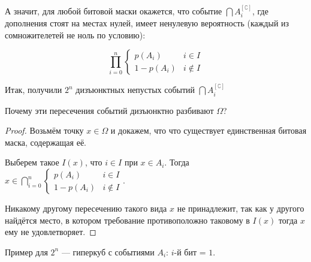 \documentclass[12pt, a4paper]{article}
\begin{document}
А значит, для любой битовой маски окажется, что событие $\bigcap A_i^{[\complement]}$, где дополнения стоят на местах нулей,
имеет ненулевую вероятность (каждый из сомножителетей не ноль по условию):

\begin{equation}
    \prod^n_{i = 0} \begin{cases}
        p(A_i) & i \in I \\
        1 - p(A_i) & i \notin I
    \end{cases}
\end{equation}

Итак, получили $2^n$ дизъюнктных непустых событий $\bigcap A_i^{[\complement]}$

\begin{remark}
    Почему эти пересечения событий дизъюнктно разбивают $\Omega$?

    \begin{proof}
    Возьмём точку $x \in \Omega$ и докажем, что что существует единственная битовая маска, содержащая её.
    
    \existence Выберем такое $I(x)$, что $i \in I$ при $x \in A_i$. Тогда $x \in \bigcap^n_{i = 0} \begin{cases}
        p(A_i) & i \in I \\
        1 - p(A_i) & i \notin I
    \end{cases}$.

    \uniqueness Никакому другому пересечению такого вида $x$ не принадлежит, так как у другого найдётся место,
    в котором требование противоположно таковому в $I(x)$ тогда $x$ ему не удовлетворяет.
\end{proof}

\end{remark}

Пример для $2^n$ — гиперкуб с событиями $A_i$: $i$-й бит = $1$.
\end{document}
